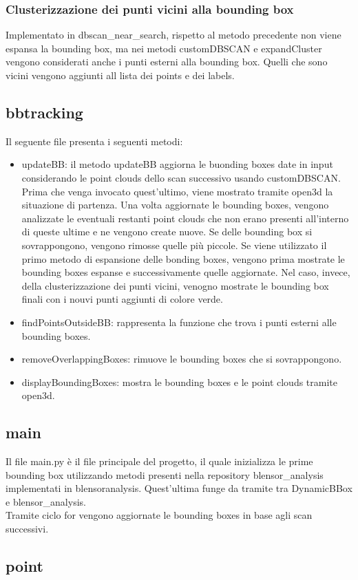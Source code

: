 \documentclass[italian]{article}
\begin{document}
\subsubsection{Clusterizzazione dei punti vicini alla bounding box}
Implementato in dbscan\_near\_search, rispetto al metodo precedente non viene espansa la bounding box, ma nei metodi customDBSCAN e expandCluster vengono considerati anche i punti esterni alla bounding box. Quelli che sono vicini vengono aggiunti all lista dei points e dei labels.
\subsection{bbtracking}
Il seguente file presenta i seguenti metodi:
\begin{itemize}
	\item updateBB: il metodo updateBB aggiorna le buonding boxes date in input considerando le point clouds dello scan successivo usando customDBSCAN. Prima che venga invocato quest'ultimo, viene mostrato tramite open3d la situazione di partenza. Una volta aggiornate le bounding boxes, vengono analizzate le eventuali restanti point clouds che non erano presenti all'interno di queste ultime e ne vengono create nuove. Se delle bounding box si sovrappongono, vengono rimosse quelle più piccole. Se viene utilizzato il primo metodo di espansione delle bonding boxes, vengono prima mostrate le bounding boxes espanse e successivamente quelle aggiornate. Nel caso, invece, della clusterizzazione dei punti vicini, venogno mostrate le bounding box finali con i nouvi punti aggiunti di colore verde.
	\item findPointsOutsideBB: rappresenta la funzione che trova i punti esterni alle bounding boxes.
	\item removeOverlappingBoxes: rimuove le bounding boxes che si sovrappongono.
	\item displayBoundingBoxes: mostra le bounding boxes e le point clouds tramite open3d.
\end{itemize}
\subsection{main}
Il file main.py è il file principale del progetto, il quale inizializza le prime bounding box utilizzando metodi presenti nella repository blensor\_analysis implementati in blensoranalysis. Quest'ultima funge da tramite tra DynamicBBox e blensor\_analysis.\\
Tramite ciclo for vengono aggiornate le bounding boxes in base agli scan successivi.
\subsection{point}
\end{document}
